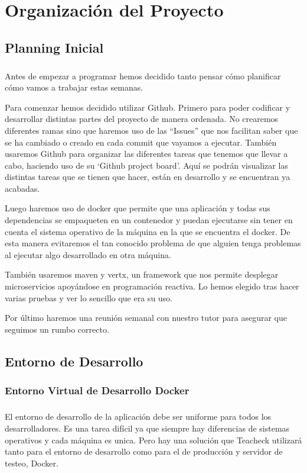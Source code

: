 \chapter{Organización del Proyecto}
\section{Planning Inicial}
\paragraph{}
Antes de empezar a programar hemos decidido tanto pensar cómo
planificar cómo vamos a trabajar estas semanas.

Para comenzar hemos decidido utilizar Github. Primero para poder
codificar y desarrollar distintas partes del proyecto de manera
ordenada. No crearemos diferentes ramas sino que haremos uso de las
“Issues” que nos facilitan saber que se ha cambiado o creado en cada
commit que vayamos a ejecutar. También usaremos Github para organizar
las diferentes tareas que tenemos que llevar a cabo, haciendo uso de
su ‘Github project board’. Aquí se podrán visualizar las distintas
tareas que se tienen que hacer, están en desarrollo y se encuentran ya
acabadas.

Luego haremos uso de docker que permite que una aplicación y todas sus
dependencias se empaqueten en un contenedor y puedan ejecutarse sin
tener en cuenta el sistema operativo de la máquina en la que se
encuentra el docker. De esta manera evitaremos el tan conocido
problema de que alguien tenga problemas al ejecutar algo desarrollado
en otra máquina.

También usaremos maven y vertx, un framework que nos permite desplegar
microservicios apoyándose en programación reactiva. Lo hemos elegido
tras hacer varias pruebas y ver lo sencillo que era su uso.

Por último haremos una reunión semanal con nuestro tutor para asegurar
que seguimos un rumbo correcto.

\section{Entorno de Desarrollo}

\subsection{Entorno Virtual de Desarrollo Docker}

\paragraph{}
El entorno de desarrollo de la aplicación debe ser uniforme para todos
los desarrolladores. Es una tarea difícil ya que siempre hay
diferencias de sistemas operativos y cada máquina es unica. Pero hay
una solución que Teacheck utilizará tanto para el entorno de
desarrollo como para el de producción y servidor de testeo, Docker.\cite{dockerDocs}

